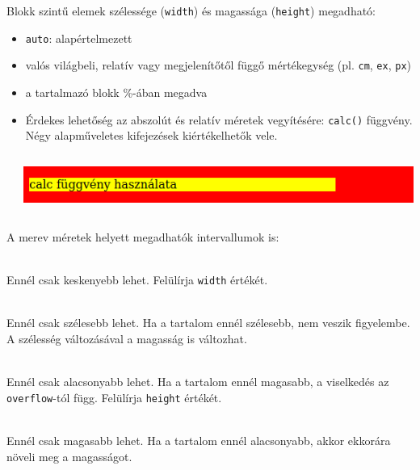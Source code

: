 \begin{frame}
  Blokk szintű elemek szélessége (\texttt{width}) és magassága (\texttt{height}) megadható:
  \begin{itemize}
    \item \texttt{auto}: alapértelmezett
    \item valós világbeli, relatív vagy megjelenítőtől függő mértékegység (pl. \texttt{cm}, \texttt{ex}, \texttt{px})
    \item a tartalmazó blokk \%-ában megadva
    \item Érdekes lehetőség az abszolút és relatív méretek vegyítésére: \texttt{calc()} függvény. Négy alapműveletes kifejezések kiértékelhetők vele.
  \end{itemize}
\end{frame}

\begin{frame}
  \begin{columns}[c]
      \begin{exampleblock}{}
        \scriptsize
        
        
      \end{exampleblock}
      \includegraphics[width=\textwidth]{calc.png}
  \end{columns}
\end{frame}

\begin{frame}
  A merev méretek helyett megadhatók intervallumok is:
  \begin{description}[m]
    \item[\texttt{max-width}] \hfill \\ Ennél csak keskenyebb lehet. Felülírja \texttt{width} értékét.
    \item[\texttt{min-width}] \hfill \\ Ennél csak szélesebb lehet. Ha a tartalom ennél szélesebb, nem veszik figyelembe. A szélesség változásával a magasság is változhat.
    \item[\texttt{max-height}] \hfill \\ Ennél csak alacsonyabb lehet. Ha a tartalom ennél magasabb, a viselkedés az \texttt{overflow}-tól függ. Felülírja \texttt{height} értékét.
    \item[\texttt{min-height}] \hfill \\ Ennél csak magasabb lehet. Ha a tartalom ennél alacsonyabb, akkor ekkorára növeli meg a magasságot.
  \end{description}
\end{frame}

